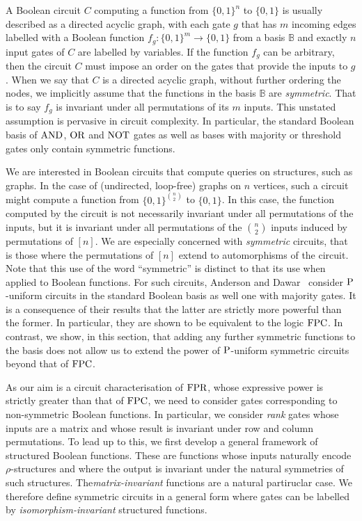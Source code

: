 \documentclass[../paper.tex]{subfiles}
\begin{document}


A Boolean circuit $C$ computing a function from $\{0,1\}^n$ to $\{0,1\}$ is
usually described as a directed acyclic graph, with each gate $g$ that has $m$
incoming edges labelled with a Boolean function $f_g : \{0,1\}^m \rightarrow
\{0,1\}$ from a basis $\mathbb{B}$ and exactly $n$ input gates of $C$ are
labelled by variables. If the function $f_g$ can be arbitrary, then the circuit
$C$ must impose an order on the gates that provide the inputs to $g$. When we
say that $C$ is a directed acyclic graph, without further ordering the nodes, we
implicitly assume that the functions in the basis $\mathbb{B}$ are
\emph{symmetric}. That is to say $f_g$ is invariant under all permutations of
its $m$ inputs. This unstated assumption is pervasive in circuit complexity. In
particular, the standard Boolean basis of $\text{\upshape AND}$, $\text{\upshape OR}$ and $\text{\upshape NOT}$ gates as well as bases
with majority or threshold gates only contain symmetric functions.

We are interested in Boolean circuits that compute queries on structures, such
as graphs. In the case of (undirected, loop-free) graphs on $n$ vertices, such a
circuit might compute a function from $\{0,1\}^{n \choose 2}$ to $\{0,1\}$. In
this case, the function computed by the circuit is not necessarily invariant
under all permutations of the inputs, but it is invariant under all permutations
of the $n \choose 2$ inputs induced by permutations of $[n]$. We are especially
concerned with \emph{symmetric} circuits, that is those where the permutations
of $[n]$ extend to automorphisms of the circuit. Note that this use of the word
``symmetric'' is distinct to that its use when applied to Boolean functions. For
such circuits, Anderson and Dawar~\cite{AndersonD17} consider $\mathrm{P}$-uniform
circuits in the standard Boolean basis as well one with majority gates. It is a
consequence of their results that the latter are strictly more powerful than the
former. In particular, they are shown to be equivalent to the logic $\text{\upshape FPC}$. In
contrast, we show, in this section, that adding any further symmetric functions
to the basis does not allow us to extend the power of $\mathrm{P}$-uniform symmetric
circuits beyond that of $\text{\upshape FPC}$.


As our aim is a circuit characterisation of $\text{\upshape FPR}$, whose expressive power is
strictly greater than that of $\text{\upshape FPC}$, we need to consider gates corresponding to
non-symmetric Boolean functions. In particular, we consider \emph{rank} gates
whose inputs are a matrix and whose result is invariant under row and column
permutations. To lead up to this, we first develop a general framework of
structured Boolean functions. These are functions whose inputs naturally encode
$\rho$-structures and where the output is invariant under the natural symmetries
of such structures. The\emph{matrix-invariant} functions are a natural
partiruclar case. We therefore define symmetric circuits in a general form where
gates can be labelled by \emph{isomorphism-invariant} structured functions.
\end{document}
